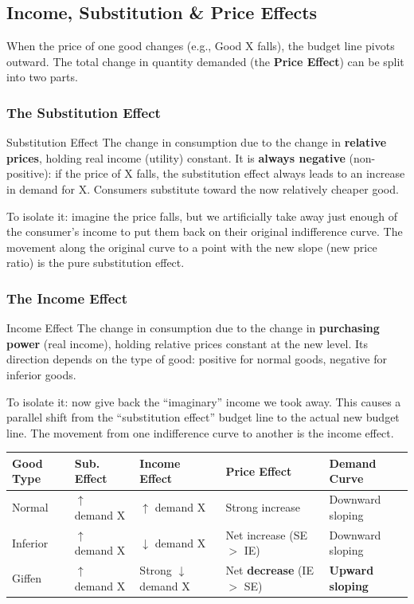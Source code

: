 \documentclass[11pt, a4paper, twoside]{book}
\begin{document}
\subsection{Income, Substitution \& Price Effects}

When the price of one good changes (e.g., Good X falls), the budget line pivots outward. The total change in quantity demanded (the \textbf{Price Effect}) can be split into two parts.

\subsubsection{The Substitution Effect}

\begin{keyterm}{Substitution Effect}
The change in consumption due to the change in \textbf{relative prices}, holding real income (utility) constant. It is \textbf{always negative} (non-positive): if the price of X falls, the substitution effect always leads to an increase in demand for X. Consumers substitute toward the now relatively cheaper good.
\end{keyterm}

To isolate it: imagine the price falls, but we artificially take away just enough of the consumer's income to put them back on their original indifference curve. The movement along the original curve to a point with the new slope (new price ratio) is the pure substitution effect.

\subsubsection{The Income Effect}

\begin{keyterm}{Income Effect}
The change in consumption due to the change in \textbf{purchasing power} (real income), holding relative prices constant at the new level. Its direction depends on the type of good: positive for normal goods, negative for inferior goods.
\end{keyterm}

To isolate it: now give back the ``imaginary'' income we took away. This causes a parallel shift from the ``substitution effect'' budget line to the actual new budget line. The movement from one indifference curve to another is the income effect.

\begin{example}
\begin{tabular}{@{}lllll@{}}
\textbf{Good Type} & \textbf{Sub. Effect} & \textbf{Income Effect} & \textbf{Price Effect} & \textbf{Demand Curve} \\
\midrule
Normal    & $\uparrow$ demand X & $\uparrow$ demand X & Strong increase & Downward sloping \\
Inferior  & $\uparrow$ demand X & $\downarrow$ demand X & Net increase (SE $>$ IE) & Downward sloping \\
Giffen    & $\uparrow$ demand X & Strong $\downarrow$ demand X & Net \textbf{decrease} (IE $>$ SE) & \textbf{Upward sloping} \\
\end{tabular}
\end{example}
\end{document}

